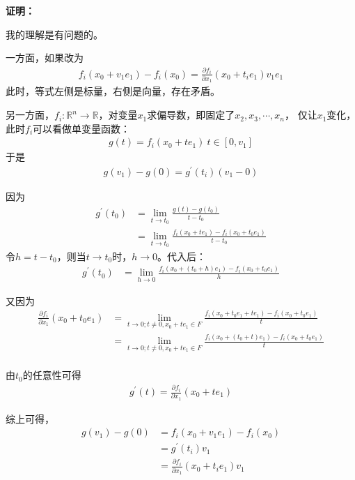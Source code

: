 \documentclass{article}
\begin{document}
\textbf{证明：}

我的理解是有问题的。

一方面，如果改为
\begin{align*}
  f_i(x_0 + v_1e_1) - f_i(x_0) = \frac{\partial f_i}{\partial x_1}(x_0 + t_ie_1)v_1e_1
\end{align*}
此时，等式左侧是标量，右侧是向量，存在矛盾。

另一方面，$f_i : \mathbb{R}^n \to \mathbb{R}$，对变量$x_1$求偏导数，即固定了$x_2, x_3, \cdots, x_n$，
仅让$x_1$变化，此时$f_i$可以看做单变量函数：
\begin{align*}
  g(t) = f_i(x_0 + te_1) \ t \in [0, v_1]
\end{align*}
于是
\begin{align*}
  g(v_1) - g(0) = g^\prime(t_i) (v_1 - 0)
\end{align*}

因为
\begin{align*}
  g^\prime(t_0)
   & = \lim\limits_{t \to t_0} \frac{g(t) - g(t_0)}{t - t_0}                       \\
   & = \lim\limits_{t \to t_0} \frac{f_i(x_0 + te_1) - f_i(x_0 + t_0e_1)}{t - t_0}
\end{align*}
令$h = t - t_0$，则当$t \to t_0$时，$h \to 0$。代入后：
\begin{align*}
  g^\prime(t_0) & = \lim\limits_{h \to 0} \frac{f_i(x_0 + (t_0 + h)e_1) - f_i(x_0 + t_0e_1)}{h}
\end{align*}

又因为
\begin{align*}
  \frac{\partial f_i}{\partial x_1}(x_0 + t_0e_1)
   & = \lim\limits_{t \to 0; t \neq 0, x_0 + te_1 \in F } \frac{f_i(x_0 + t_0e_1 + te_1) - f_i(x_0 + t_0e_1)}{t} \\
   & = \lim\limits_{t \to 0; t \neq 0, x_0 + te_1 \in F } \frac{f_i(x_0 + (t_0 + t)e_1) - f_i(x_0 + t_0e_1)}{t}  \\
\end{align*}

由$t_0$的任意性可得
\begin{align*}
  g^\prime(t) = \frac{\partial f_i}{\partial x_1}(x_0 + te_1)
\end{align*}

综上可得，
\begin{align*}
  g(v_1) - g(0) & = f_i(x_0 + v_1e_1) - f_i(x_0)                       \\
                & = g^\prime(t_i)v_1                                   \\
                & = \frac{\partial f_i}{\partial x_1}(x_0 + t_ie_1)v_1
\end{align*}
\end{document}
